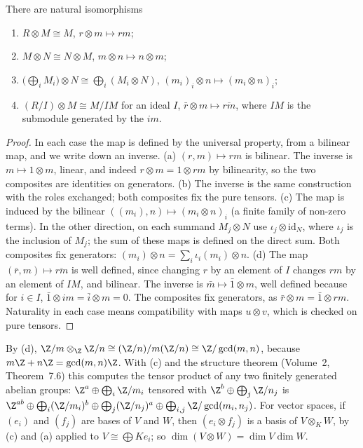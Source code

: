 \begin{proposition}\label{prop:tensorrules}
There are natural isomorphisms
\begin{enumerate}[label=(\alph*)]
\item $R\otimes M\cong M$, $r\otimes m\mapsto rm$;
\item $M\otimes N\cong N\otimes M$, $m\otimes n\mapsto n\otimes m$;
\item $\bigl(\bigoplus_iM_i\bigr)\otimes N\cong\bigoplus_i(M_i\otimes N)$, $(m_i)_i\otimes n\mapsto(m_i\otimes n)_i$;
\item $(R/I)\otimes M\cong M/IM$ for an ideal $I$, $\bar r\otimes m\mapsto\overline{rm}$, where $IM$ is the submodule generated by the $im$.
\end{enumerate}
\end{proposition}

\begin{proof}
In each case the map is defined by the universal property, from a bilinear map, and we write down an inverse.
(a) $(r,m)\mapsto rm$ is bilinear. The inverse is $m\mapsto1\otimes m$, linear, and indeed $r\otimes m=1\otimes rm$ by bilinearity, so the two composites are identities on generators.
(b) The inverse is the same construction with the roles exchanged; both composites fix the pure tensors.
(c) The map is induced by the bilinear $((m_i),n)\mapsto(m_i\otimes n)_i$ (a finite family of non-zero terms). In the other direction, on each summand $M_j\otimes N$ use $\iota_j\otimes\mathrm{id}_N$, where $\iota_j$ is the inclusion of $M_j$; the sum of
these maps is defined on the direct sum. Both composites fix generators: $(m_i)\otimes n=\sum_i\iota_i(m_i)\otimes n$.
(d) The map $(\bar r,m)\mapsto\overline{rm}$ is well defined, since changing $r$ by an element of $I$ changes $rm$ by an element of $IM$, and bilinear. The inverse is $\bar m\mapsto\bar1\otimes m$, well defined because for $i\in I$,
$\bar1\otimes im=\bar i\otimes m=0$. The composites fix generators, as $\bar r\otimes m=\bar1\otimes rm$.
Naturality in each case means compatibility with maps $u\otimes v$, which is checked on pure tensors.
\end{proof}

\begin{example}\label{ex:zmzn}
By (d), $\Z/m\otimes_{\Z}\Z/n\cong(\Z/n)/m(\Z/n)\cong\Z/\gcd(m,n)$, because $m\Z+n\Z=\gcd(m,n)\Z$. With (c) and the structure theorem (Volume~2, Theorem~7.6) this computes the tensor product of any two finitely
generated abelian groups: $\Z^a\oplus\bigoplus_i\Z/m_i$ tensored with $\Z^b\oplus\bigoplus_j\Z/n_j$ is $\Z^{ab}\oplus\bigoplus_i(\Z/m_i)^b\oplus\bigoplus_j(\Z/n_j)^a\oplus\bigoplus_{i,j}\Z/\gcd(m_i,n_j)$. For
vector spaces, if $(e_i)$ and $(f_j)$ are bases of $V$ and $W$, then $(e_i\otimes f_j)$ is a basis of $V\otimes_KW$, by (c) and (a) applied to $V\cong\bigoplus Ke_i$; so $\dim(V\otimes W)=\dim V\dim W$.
\end{example}

